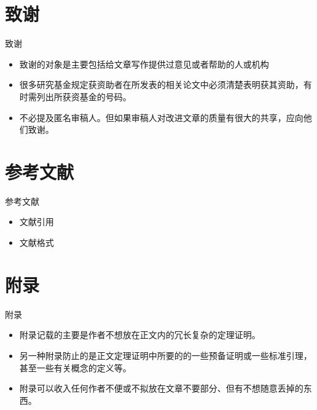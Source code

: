 \documentclass[13pt]{ctexbeamer}
\begin{document}
\section{致谢}
\begin{frame}{致谢}
	
	\begin{itemize}
		\item  致谢的对象是主要包括给文章写作提供过意见或者帮助的人或机构
		\item  很多研究基金规定获资助者在所发表的\alert{相关}论文中必须清楚表明获其资助，有时需列出所获资基金的号码。
		\item 不必提及匿名审稿人。但如果审稿人对改进文章的质量有很大的共享，应向他们致谢。
	\end{itemize}
\end{frame}

\section{参考文献}
\begin{frame}{参考文献}
	
	\begin{itemize}
		\item  文献引用
		\item  文献格式
	\end{itemize}
\end{frame}

\section{附录}
\begin{frame}{附录}
	
	\begin{itemize}
		\item  附录记载的主要是作者不想放在正文内的冗长复杂的定理证明。
		\item  另一种附录防止的是正文定理证明中所要的的一些预备证明或一些标准引理，甚至一些有关概念的定义等。
		\item 附录可以收入任何作者不便或不拟放在文章不要部分、但有不想随意丢掉的东西。
	\end{itemize}
\end{frame}
\end{document}
